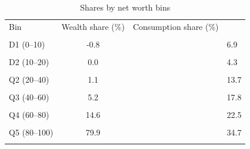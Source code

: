 \begin{table}[!htbp]\centering
\caption{Shares by net worth bins}
\label{tab:shares_by_wealthbin}
\begin{tabular}{lcc}
\hline\hline
Bin & Wealth share (\%) & Consumption share (\%) \\\\
\hline
D1 (0--10) &   -0.8 & &    6.9 & \\\\
D2 (10--20) &    0.0 & &    4.3 & \\\\
Q2 (20--40) &    1.1 & &   13.7 & \\\\
Q3 (40--60) &    5.2 & &   17.8 & \\\\
Q4 (60--80) &   14.6 & &   22.5 & \\\\
Q5 (80--100) &   79.9 & &   34.7 & \\\\
\hline\hline
\end{tabular}
\end{table}
